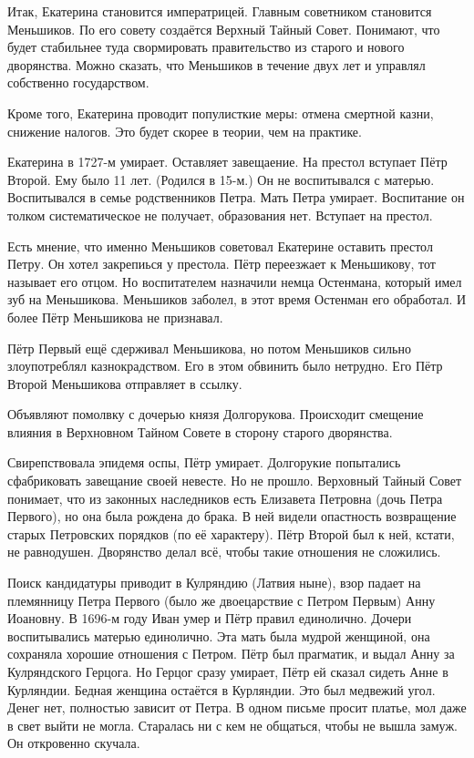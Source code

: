 Итак, Екатерина становится императрицей. Главным советником становится Меньшиков. По его совету создаётся Верхный Тайный Совет. Понимают, что будет стабильнее туда свормировать правительство из старого и нового дворянства. Можно сказать, что Меньшиков в течение двух лет и управлял собственно государством. 

Кроме того, Екатерина проводит популисткие меры: отмена смертной казни, снижение налогов. Это будет скорее в теории, чем на практике.

Екатерина в 1727-м умирает. Оставляет завещаение. На престол вступает Пётр Второй. Ему было 11 лет. (Родился в 15-м.) Он не воспитывался с матерью. Воспитывался в семье родственников Петра. Мать Петра умирает. Воспитание он толком систематическое не получает, образования нет. Вступает на престол.

Есть мнение, что именно Меньшиков советовал Екатерине оставить престол Петру. Он хотел закрепиься у престола. Пётр переезжает к Меньшикову, тот называет его отцом. Но воспитателем назначили немца Остенмана, который имел зуб на Меньшикова. Меньшиков заболел, в этот время Остенман его обработал. И более Пётр Меньшикова не признавал.

Пётр Первый ещё сдерживал Меньшикова, но потом Меньшиков сильно злоупотреблял казнокрадством. Его в этом обвинить было нетрудно. Его Пётр Второй Меньшикова отправляет в ссылку.

Объявляют помолвку с дочерью князя Долгорукова. Происходит смещение влияния в Верхновном Тайном Совете в сторону старого дворянства. 

Свирепствовала эпидемя оспы, Пётр умирает. Долгорукие попытались сфабриковать завещание своей невесте. Но не прошло. Верховный Тайный Совет понимает, что из законных наследников есть Елизавета Петровна (дочь Петра Первого), но она была рождена до брака. В ней видели опастность возвращение старых Петровских порядков (по её характеру). Пётр Второй был к ней, кстати, не равнодушен. Дворянство делал всё, чтобы такие отношения не сложились.

Поиск кандидатуры приводит в Кулряндию (Латвия ныне), взор падает на племянницу Петра Первого (было же двоецарствие с Петром Первым) Анну Иоановну. В 1696-м году Иван умер и Пётр правил единолично. Дочери воспитывались матерью единолично. Эта мать была мудрой женщиной, она сохраняла хорошие отношения с Петром. Пётр был прагматик, и выдал Анну за Кулряндского Герцога. Но Герцог сразу умирает, Пётр ей сказал сидеть Анне в Курляндии. Бедная женщина остаётся в Курляндии. Это был медвежий угол. Денег нет, полностью зависит от Петра. В одном письме просит платье, мол даже в свет выйти не могла. Старалась ни с кем не общаться, чтобы не вышла замуж. Он откровенно скучала.

